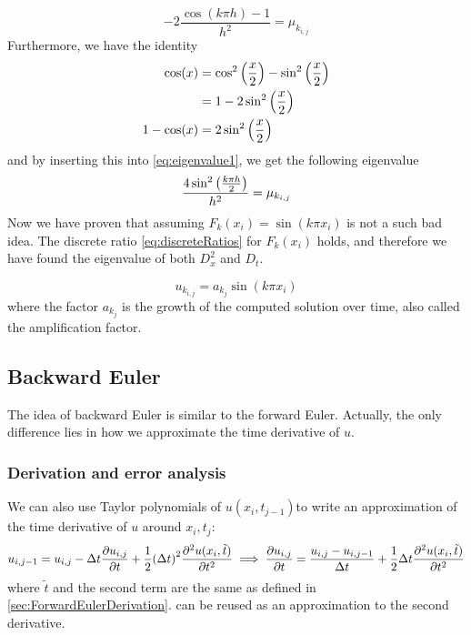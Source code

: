 \documentclass[12pt,english,a4paper]{article}
\begin{document}
\begin{equation}\label{eq:eigenvalue1}
-2\frac{\cos(k\pi h) - 1}{h^2} =\mu_{k_{i,j}}
\end{equation}
Furthermore, we have the identity
\begin{align*}
\cos(x) &= \cos^2\qty(\frac{x}{2}) - \sin^2\qty(\frac{x}{2}) \\
&= 1- 2\sin^2\qty(\frac{x}{2}) \\
1-\cos(x) &= 2\sin^2\qty(\frac{x}{2})
\end{align*}
and by inserting this into \vref{eq:eigenvalue1}, we get the following eigenvalue
\[
\frac{4\sin^2\qty(\frac{k\pi h}{2})}{h^2} =\mu_{k_{i,j}}
\]
Now we have proven that assuming \(F_k(x_i) = \sin(k\pi x_i)\) is not a such bad idea. The discrete ratio \vref{eq:discreteRatios} for \(F_k(x_i)\) holds, and therefore we have found the eigenvalue of both \(D_x^2\) and \(D_t\). \\

\[
u_{k_{i,j}} = a_{k_{j}}\sin(k \pi x_i)
\]
where the factor \(a_{k_j}\) is the growth of the computed solution over time, also called the amplification factor.
%
\subsection{Backward Euler} \label{sec:backwardEuler}
The idea of backward Euler is similar to the forward Euler. Actually, the only difference lies in how we approximate the time derivative of \(u\).
\subsubsection{Derivation and error analysis}
We can also use Taylor polynomials of \(u(x_i,t_{j-1})\)to write an approximation of the time derivative of \(u\) around \(x_i,t_j\):
\[
    u_{i,j-1} = u_{i,j} - \Delta t\pdv{u_{i,j}}{t} + \frac{1}{2}\qty(\Delta t)^2\pdv[2]{u(x_i,\tilde{t})}{t}
    \implies \pdv{u_{i,j}}{t} = \frac{u_{i,j}-u_{i,j-1}}{\Delta t} + \frac{1}{2}\Delta t\pdv[2]{u(x_i,\tilde{t})}{t}
\]
where \(\tilde{t}\) and the second term are the same as defined in \vref{sec:ForwardEulerDerivation}.  can be reused as an approximation to the second derivative.
\end{document}
